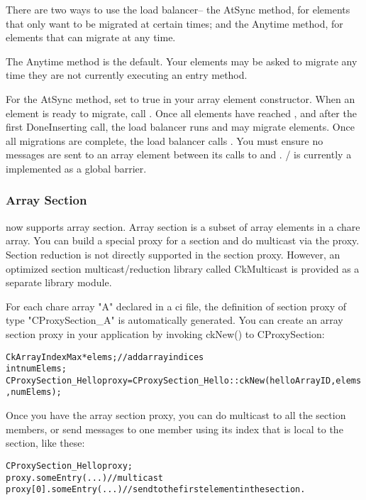 There are two ways to use the load balancer-- the AtSync
method, for elements that only want to be migrated at certain
times; and the Anytime method, for elements that can migrate
at any time.

The Anytime method is the default.  Your elements may be
asked to migrate any time they are not currently executing
an entry method.

For the AtSync method, set  to true in your 
array element constructor.  When an element is ready to migrate,
call .  Once all elements have reached , 
and after the first DoneInserting call,
the load balancer runs and may migrate elements.  Once
all migrations are complete, the load balancer calls 
.  You must ensure no messages are
sent to an array element between its calls to  and
. / is currently
a implemented as a global barrier.


\subsubsection{Array Section}

\charmpp{} now supports array section. Array section is a subset of array 
elements in a chare array. You can build a special proxy for a section and do 
multicast via the proxy. Section reduction is not directly supported in the 
section proxy. However, an optimized section multicast/reduction library called 
CkMulticast is provided as a separate library module. 

For each chare array "A" declared in a ci file, the definition of section proxy 
of type "CProxySection\_A" is automatically generated. You can create an array 
section proxy in your application by invoking ckNew() to CProxySection:

\begin{alltt}
  CkArrayIndexMax *elems;    // add array indices
  int numElems;
  CProxySection_Hello proxy = CProxySection_Hello::ckNew(helloArrayID, elems, numElems);
\end{alltt}

Once you have the array section proxy, you can do multicast to all the 
section members, or send messages to one member using its index that
is local to the section, like these:

\begin{alltt}
  CProxySection_Hello proxy;
  proxy.someEntry(...)          // multicast
  proxy[0].someEntry(...)       // send to the first element in the section.
\end{alltt}

